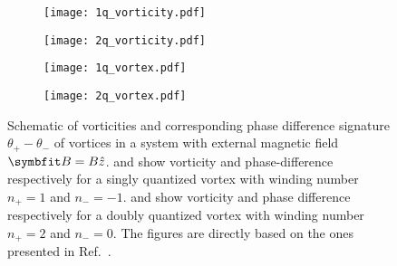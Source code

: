 \begin{figure}[h]
    \newcommand{\fractionwidth}{.38}
    \centering
    \begin{subfigure}[b]{\fractionwidth\textwidth}
        \centering
        \texttt{[image: 1q\_vorticity.pdf]}
        \caption{\label{fig:Vor:schematic:1q:v}}
    \end{subfigure}
    \hspace{2em}
    \begin{subfigure}[b]{\fractionwidth\textwidth}
        \centering
        \texttt{[image: 2q\_vorticity.pdf]}
        \caption{\label{fig:Vor:schematic:2q:v}}
    \end{subfigure}

    \begin{subfigure}[b]{\fractionwidth\textwidth}
        \centering
        \texttt{[image: 1q\_vortex.pdf]}
        \caption{\label{fig:Vor:schematic:1q:pd}}
    \end{subfigure}
    \hspace{2em}
    \begin{subfigure}[b]{\fractionwidth\textwidth}
        \centering
        \texttt{[image: 2q\_vortex.pdf]}
        \caption{\label{fig:Vor:schematic:2q:pd}}
    \end{subfigure}
    \caption{Schematic of vorticities and corresponding phase difference signature $\theta_+-\theta_-$ of vortices in a system with external magnetic field $\v{B} = B\hat{z}$. 
     \protect{} and \protect{} show vorticity and phase-difference respectively for a 
     singly quantized vortex with winding number $n_+=1$ and $n_-=-1$.
     \protect{} and \protect{} show vorticity and phase difference respectively for a doubly quantized vortex with winding number $n_+=2$ and $n_-=0$. The figures are directly based on the ones presented in Ref.~\cite{AsleGaraud16}.}
    \label{fig:Vor:schematic}
\end{figure}




